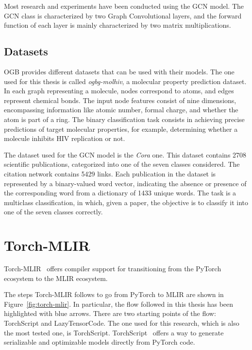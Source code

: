 Most research and experiments have been conducted using the GCN model.
The GCN class is characterized by two Graph Convolutional layers, and the forward function of each layer is mainly characterized by two matrix multiplications.


\subsection{Datasets}
\label{subsec:gnn_datasets}%

OGB provides different datasets that can be used with their models.
The one used for this thesis is called \textit{ogbg-molhiv}, a molecular property prediction dataset.
In each graph representing a molecule, nodes correspond to atoms, and edges represent chemical bonds.
The input node features consist of nine dimensions, encompassing information like atomic number, formal charge, and whether the atom is part of a ring.
The binary classification task consists in achieving precise predictions of target molecular properties, for example, determining whether a molecule inhibits HIV replication or not.

The dataset used for the GCN model is the \textit{Cora} one.
This dataset contains 2708 scientific publications, categorized into one of the seven classes considered.
The citation network contains 5429 links.
Each publication in the dataset is represented by a binary-valued word vector, indicating the absence or presence of the corresponding word from a dictionary of 1433 unique words.
The task is a multiclass classification, in which, given a paper, the objective is to classify it into one of the seven classes correctly.

\section{Torch-MLIR}
\label{sec:toolchain-torch_mlir}%

Torch-MLIR~\cite{torch_mlir} offers compiler support for transitioning from the PyTorch ecosystem to the MLIR ecosystem.

The steps Torch-MLIR follows to go from PyTorch to MLIR are shown in Figure~\ref{fig:torch-mlir}.
In particular, the flow followed in this thesis has been highlighted with blue arrows.
There are two starting points of the flow: TorchScript and LazyTensorCode.
The one used for this research, which is also the most tested one, is TorchScript.
TorchScript~\cite{torchscript} offers a way to generate serializable and optimizable models directly from PyTorch code.


